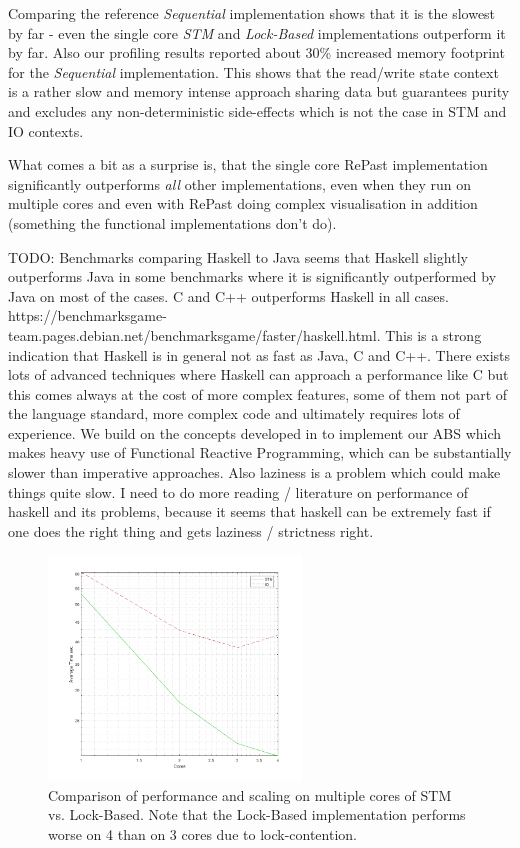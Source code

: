 Comparing the reference \textit{Sequential} implementation shows that it is the slowest by far - even the single core \textit{STM} and \textit{Lock-Based} implementations outperform it by far. Also our profiling results reported about 30\% increased memory footprint for the \textit{Sequential} implementation. This shows that the read/write state context is a rather slow and memory intense approach sharing data but guarantees purity and excludes any non-deterministic side-effects which is not the case in STM and IO contexts.

What comes a bit as a surprise is, that the single core RePast implementation significantly outperforms \textit{all} other implementations, even when they run on multiple cores and even with RePast doing complex visualisation in addition (something the functional implementations don't do).

TODO: Benchmarks comparing Haskell to Java seems that Haskell slightly outperforms Java in some benchmarks where it is significantly outperformed by Java on most of the cases. C and C++ outperforms Haskell in all cases. https://benchmarksgame-team.pages.debian.net/benchmarksgame/faster/haskell.html. This is a strong indication that Haskell is in general not as fast as Java, C and C++. There exists lots of advanced techniques where Haskell can approach a performance like C but this comes always at the cost of more complex features, some of them not part of the language standard, more complex code and ultimately requires lots of experience. We build on the concepts developed in \cite{thaler_pure_2019} to implement our ABS which makes heavy use of Functional Reactive Programming, which can be substantially slower than imperative approaches. Also laziness is a problem which could make things quite slow.
I need to do more reading / literature on performance of haskell and its problems, because it seems that haskell can be extremely fast if one does the right thing and gets laziness / strictness right.


\begin{figure}
	\centering
	\includegraphics[width=0.6\textwidth, angle=0]{./fig/sir/core_duration_stm_io.png}
	\caption{Comparison of performance and scaling on multiple cores of STM vs. Lock-Based. Note that the Lock-Based implementation performs worse on 4 than on 3 cores due to lock-contention.}
	\label{fig:core_duration_stm_io}
\end{figure}

